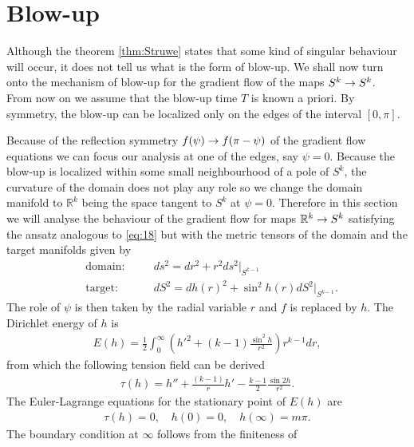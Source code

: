 \section{Blow-up}
\label{sec:blow-up}

Although the theorem \ref{thm:Struwe} states that some kind of
singular behaviour will occur, it does not tell us what is the form of
blow-up. We shall now turn onto the mechanism of blow-up for the
gradient flow of the maps $S^k\rightarrow S^k$.\\

From now on we assume that the blow-up time $T$ is known a priori. By
symmetry, the blow-up can be localized only on the edges of the
interval $[0,\pi]$.%

Because of the reflection symmetry $f(\psi)\rightarrow f(\pi-\psi)$ of the
gradient flow equations we can focus our analysis at one of the edges,
say $\psi=0$. Because the blow-up is localized within some small
neighbourhood of a pole of $S^k$, the curvature of the domain does not
play any role so we change the domain manifold to $\mathbb{R}^k$ being
the space tangent to $S^k$ at $\psi=0$. Therefore in this section we
will analyse the behaviour of the gradient flow for maps
$\mathbb{R}^k\rightarrow S^k$ satisfying the ansatz analogous to \eqref{eq:18}
but with the metric tensors of the domain and the target manifolds
given by
\begin{align}\label{eq:71}
  &\text{domain:}&\quad &ds^2=dr^2+r^2ds^2\big|_{S^{k-1}}\\
  &\text{target:}&\quad &dS^2=dh(r)^2+\sin^2h(r)dS^2\big|_{S^{k-1}}.
\end{align}
The role of $\psi$ is then taken by the radial variable $r$ and $f$ is
replaced by $h$. The Dirichlet energy of $h$ is
\begin{align}
  \label{eq:72}
  E(h)=\frac{1}{2}\int_0^\infty \left(h'^2+(k-1)\frac{\sin^2
      h}{r^2}\right)r^{k-1}dr,
\end{align}
from which the following tension field can be derived
\begin{align}
  \label{eq:73}
  \tau(h)=h''+\frac{(k-1)}{r}h'-\frac{k-1}{2}\frac{\sin2h}{r^2}.
\end{align}
The Euler-Lagrange equations for the stationary point of $E(h)$ are
\begin{align}
  \label{eq:74}
  \tau(h)=0,\quad
  h(0)=0,\quad h(\infty)=m\pi.
\end{align}
The boundary condition at $\infty$ follows from the finiteness of
